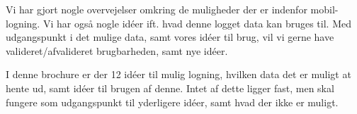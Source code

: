Vi har gjort nogle overvejelser omkring de muligheder der er indenfor mobil-logning.
Vi har også nogle idéer ift. hvad denne logget data kan bruges til.
Med udgangspunkt i det mulige data, samt vores idéer til brug, vil vi gerne have valideret/afvalideret brugbarheden, samt nye idéer.

I denne brochure er der 12 idéer til mulig logning, hvilken data det er muligt at hente ud, samt idéer til brugen af denne.
Intet af dette ligger fast, men skal fungere som udgangspunkt til yderligere idéer, samt hvad der ikke er muligt.
